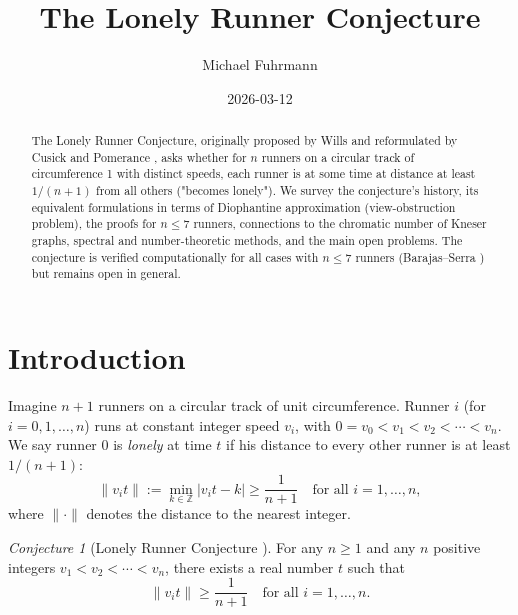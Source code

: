 \documentclass[12pt,a4paper]{amsart}
\theoremstyle{definition}
\theoremstyle{remark}
\newtheorem{conjecture}[theorem]{Conjecture}
\newcommand{\Z}{\mathbb{Z}}
\begin{document}
\begin{abstract}
The Lonely Runner Conjecture, originally proposed by Wills \cite{Wills1967} and
reformulated by Cusick and Pomerance \cite{CusickPomerance1984}, asks whether
for $n$ runners on a circular track of circumference 1 with distinct speeds, each
runner is at some time at distance at least $1/(n+1)$ from all others
("becomes lonely"). We survey the conjecture's history, its equivalent
formulations in terms of Diophantine approximation (view-obstruction problem),
the proofs for $n \leq 7$ runners, connections to the chromatic number of
Kneser graphs, spectral and number-theoretic methods, and the main open problems.
The conjecture is verified computationally for all cases with $n \leq 7$ runners
(Barajas--Serra \cite{BarajasSerra2008}) but remains open in general.
\end{abstract}

\title{The Lonely Runner Conjecture}

\author{Michael Fuhrmann}
\address{Specialist Mathematics Project, Build 164}
\date{2026-03-12}

\maketitle

\tableofcontents

\section{Introduction}

Imagine $n+1$ runners on a circular track of unit circumference. Runner $i$
(for $i = 0, 1, \ldots, n$) runs at constant integer speed $v_i$, with
$0 = v_0 < v_1 < v_2 < \cdots < v_n$. We say runner 0 is
\emph{lonely} at time $t$ if his distance to every other runner is at least $1/(n+1)$:
\[
  \|v_i t\| := \min_{k \in \Z} |v_i t - k| \geq \frac{1}{n+1}
  \quad \text{for all } i = 1, \ldots, n,
\]
where $\|\cdot\|$ denotes the distance to the nearest integer.

\begin{conjecture}[Lonely Runner Conjecture \cite{Wills1967,CusickPomerance1984}]
\label{conj:lrc}
For any $n \geq 1$ and any $n$ positive integers $v_1 < v_2 < \cdots < v_n$,
there exists a real number $t$ such that
\[
  \|v_i t\| \geq \frac{1}{n+1} \quad \text{for all } i = 1, \ldots, n.
\]
\end{conjecture}
\end{document}
